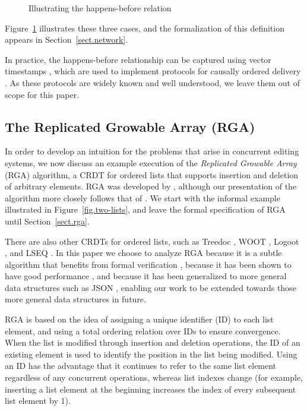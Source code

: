 \begin{figure}
\centering

\caption{Illustrating the happens-before relation}\label{fig.happens-before}
\end{figure}

Figure~\ref{fig.happens-before} illustrates these three cases, and the formalization of this
definition appears in Section~\ref{sect.network}.

In practice, the happens-before relationship can be captured using vector timestamps
\cite{Schwarz:1994gl,Fidge:1988tv}, which are used to implement protocols for causally ordered
delivery \cite{Cachin:2011wt}. As these protocols are widely known and well understood, we leave
them out of scope for this paper.

\subsection{The Replicated Growable Array (RGA)}\label{sect.rga.background}

In order to develop an intuition for the problems that arise in concurrent editing systems, we now
discuss an example execution of the \emph{Replicated Growable Array} (RGA) algorithm, a CRDT for
ordered lists that supports insertion and deletion of arbitrary elements. RGA was developed by
\citet{Roh:2011dw}, although our presentation of the algorithm more closely follows that of
\citet{Shapiro:2011wy}. We start with the informal example illustrated in
Figure~\ref{fig.two-lists}, and leave the formal specification of RGA until Section~\ref{sect.rga}.

There are also other CRDTs for ordered lists, such as Treedoc \cite{Preguica:2009fz}, WOOT
\cite{Oster:2006wj}, Logoot \cite{Weiss:2010hx}, and LSEQ \cite{Nedelec:2013ky}. In this paper we
choose to analyze RGA because it is a subtle algorithm that benefits from formal verification
\cite{Attiya:2016kh}, because it has been shown to have good performance \cite{Mehdi:2011ke}, and
because it has been generalized to more general data structures such as JSON
\cite{Kleppmann:2016ve}, enabling our work to be extended towards those more general data structures
in future.

RGA is based on the idea of assigning a unique identifier (ID) to each list element, and using a
total ordering relation over IDs to ensure convergence. When the list is modified through insertion
and deletion operations, the ID of an existing element is used to identify the position in the list
being modified. Using an ID has the advantage that it continues to refer to the same list element
regardless of any concurrent operations, whereas list indexes change (for example, inserting a list
element at the beginning increases the index of every subsequent list element by 1).

